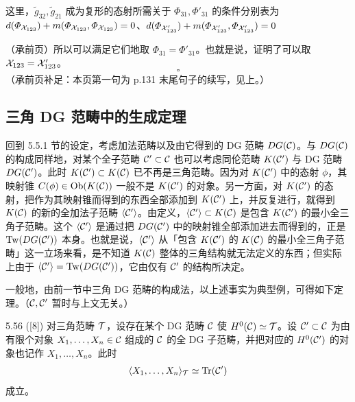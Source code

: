 这里，$\tilde{g}_{32}, \tilde{g}_{21}$ 成为复形的态射所需关于 $\varPhi_{31}, \varPhi'_{31}$ 的条件分别表为 $d(\varPhi_{\mathcal{X}_{123}}) + m(\varPhi_{\mathcal{X}_{123}}, \varPhi_{\mathcal{X}_{123}}) = 0$、$d(\varPhi_{\mathcal{X}'_{123}}) + m(\varPhi_{\mathcal{X}'_{123}}, \varPhi_{\mathcal{X}'_{123}}) = 0$


（承前页）所以可以满足它们地取 $\varPhi_{31} = \varPhi'_{31}$。也就是说，证明了可以取 $\mathcal{X}_{123} = \mathcal{X}'_{123}$。
\[
  \square
\]
（承前页补足：本页第一句为 p.131 末尾句子的续写，见上。）

\subsection{三角 DG 范畴中的生成定理}

回到 5.5.1 节的设定，考虑加法范畴以及由它得到的 DG 范畴 $DG(\mathcal{C})$。与 $DG(\mathcal{C})$ 的构成同样地，对某个全子范畴 $\mathcal{C}' \subset \mathcal{C}$ 也可以考虑同伦范畴 $K(\mathcal{C}')$ 与 DG 范畴 $DG(\mathcal{C}')$。此时 $K(\mathcal{C}') \subset K(\mathcal{C})$ 已不再是三角范畴。因为对 $K(\mathcal{C}')$ 中的态射 $\phi$，其映射锥 $C(\phi) \in \operatorname{Ob}(K(\mathcal{C}))$ 一般不是 $K(\mathcal{C}')$ 的对象。另一方面，对 $K(\mathcal{C}')$ 的态射，把作为其映射锥而得到的东西全部添加到 $K(\mathcal{C}')$ 上，并反复进行，就得到 $K(\mathcal{C})$ 的新的全加法子范畴 $\langle\mathcal{C}'\rangle$。由定义，$\langle\mathcal{C}'\rangle \subset K(\mathcal{C})$ 是包含 $K(\mathcal{C}')$ 的最小全三角子范畴。这个 $\langle\mathcal{C}'\rangle$ 是通过把 $DG(\mathcal{C}')$ 中的映射锥全部添加进去而得到的，正是 $\mathrm{Tw}(DG(\mathcal{C}'))$ 本身。也就是说，$\langle\mathcal{C}'\rangle$ 从「包含 $K(\mathcal{C}')$ 的 $K(\mathcal{C})$ 的最小全三角子范畴」这一立场来看，是不知道 $K(\mathcal{C})$ 整体的三角结构就无法定义的东西；但实际上由于 $\langle\mathcal{C}'\rangle = \mathrm{Tw}(DG(\mathcal{C}'))$，它由仅有 $\mathcal{C}'$ 的结构所决定。

一般地，由前一节中三角 DG 范畴的构成法，以上述事实为典型例，可得如下定理。（$\mathcal{C}, \mathcal{C}'$ 暂时与上文无关。）

\begin{theorem}{5.56} ([8]) 对三角范畴 $\mathcal{T}$，设存在某个 DG 范畴 $\mathcal{C}$ 使 $H^{0}(\mathcal{C}) \simeq \mathcal{T}$。设 $\mathcal{C}' \subset \mathcal{C}$ 为由有限个对象 $X_{1},\ldots,X_{n} \in \mathcal{C}$ 组成的 $\mathcal{C}$ 的全 DG 子范畴，并把对应的 $H^{0}(\mathcal{C}')$ 的对象也记作 $X_{1},\ldots,X_{n}$。此时
\[
  \langle X_{1},\ldots,X_{n}\rangle_{\mathcal{T}} \simeq \operatorname{Tr}(\mathcal{C}')
\]
成立。\end{theorem}

